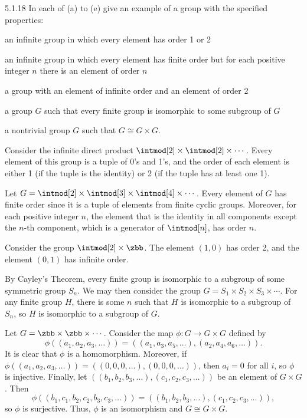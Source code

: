 \begin{exercise}{5.1.18}
    In each of (a) to (e) give an example of a group with the specified properties:
    \begin{subexercises}
        \item an infinite group in which every element has order 1 or 2
        \item an infinite group in which every element has finite order but for each positive integer $n$ there is an element of order $n$
        \item a group with an element of infinite order and an element of order 2
        \item a group $G$ such that every finite group is isomorphic to some subgroup of $G$
        \item a nontrivial group $G$ such that $G \cong G \times G$.
    \end{subexercises}
\end{exercise}

\begin{solenum}
    \item Consider the infinite direct product $\intmod[2] \times \intmod[2] \times \cdots$.
	Every element of this group is a tuple of 0's and 1's, and the order of each element is either 1 (if the tuple is the identity) or 2 (if the tuple has at least one 1).
    \item Let $G = \intmod[2] \times \intmod[3] \times \intmod[4] \times \cdots$.
	Every element of $G$ has finite order since it is a tuple of elements from finite cyclic groups.
	Moreover, for each positive integer $n$, the element that is the identity in all components except the $n$-th component, which is a generator of $\intmod[n]$, has order $n$.
    \item Consider the group $\intmod[2] \times \zbb$.
	The element $(1, 0)$ has order 2, and the element $(0, 1)$ has infinite order.
    \item By Cayley's Theorem, every finite group is isomorphic to a subgroup of some symmetric group $S_n$.
	We may then consider the group $G = S_1 \times S_2 \times S_3 \times \cdots$.
	For any finite group $H$, there is some $n$ such that $H$ is isomorphic to a subgroup of $S_n$, so $H$ is isomorphic to a subgroup of $G$.
    \item Let $G = \zbb \times \zbb \times \cdots$.
	Consider the map $\phi \colon G \to G \times G$ defined by
    \[
    	\phi((a_1, a_2, a_3, \ldots)) = ((a_1, a_3, a_5, \ldots), (a_2, a_4, a_6, \ldots)).
    \]
    It is clear that $\phi$ is a homomorphism.
	Moreover, if $\phi((a_1, a_2, a_3, \ldots)) = ((0, 0, 0, \ldots), (0, 0, 0, \ldots))$, then $a_i = 0$ for all $i$, so $\phi$ is injective.
	Finally, let $((b_1, b_2, b_3, \ldots), (c_1, c_2, c_3, \ldots))$ be an element of $G \times G$.
	Then 
    \[
    	\phi((b_1, c_1, b_2, c_2, b_3, c_3, \ldots)) = ((b_1, b_2, b_3, \ldots), (c_1, c_2, c_3, \ldots)),
    \]
    so $\phi$ is surjective.
	Thus, $\phi$ is an isomorphism and $G \cong G \times G$.
\end{solenum}